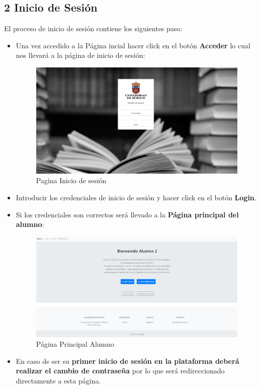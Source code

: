 \subsection{2 Inicio de Sesión}
El proceso de inicio de sesión contiene los siguientes paso:
\begin{itemize}
\tightlist
    \item Una vez accedido a la Página incial hacer click en el botón \textbf{Acceder} lo cual nos llevará a la página de inicio de sesión:
        \begin{figure}[H]
        \centering
        \includegraphics[width=\textwidth]{img/imgs-memoria/InicioSesion.PNG}
        \caption{Pagina Inicio de sesión}
        \end{figure}
    \item Introducir los credenciales de inicio de sesión y hacer click en el botón \textbf{Login}.
    \item Si los credenciales son correctos será llevado a la \textbf{Página principal del alumno}:
        \begin{figure}[H]
        \centering
        \includegraphics[width=\textwidth]{img/imgs-memoria/StudentMain.PNG}
        \caption{Página Principal Alumno}
        \label{PagAlumno}
        \end{figure}
    \item En caso de ser su \textbf{primer inicio de sesión en la plataforma deberá realizar el cambio de contraseña} por lo que será redireccionado directamente a esta página.
\end{itemize}

